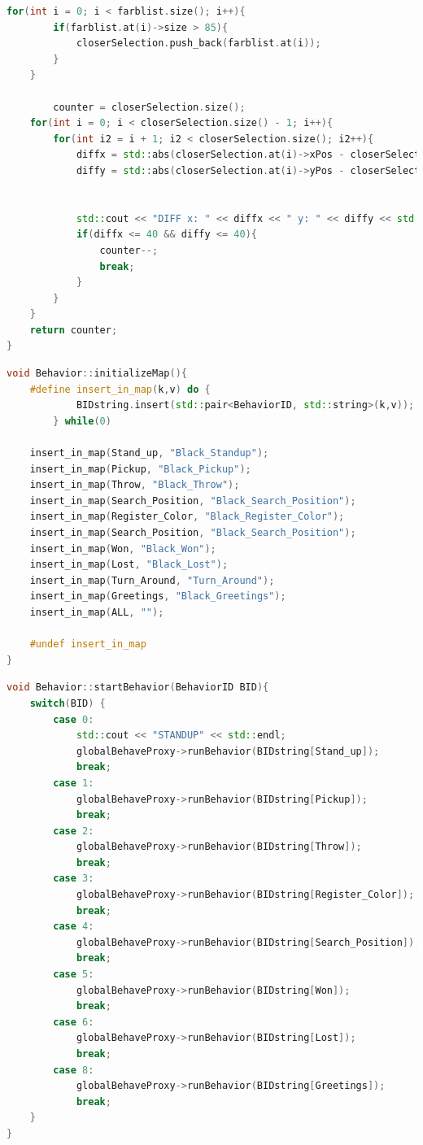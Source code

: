 \begin{appendix}
\begin{lstlisting}[language=c++,
                   caption={Funktion: "`getDiceValue''},
                   label={lst:getDiveValue1}]
    for(int i = 0; i < farblist.size(); i++){
        if(farblist.at(i)->size > 85){
            closerSelection.push_back(farblist.at(i));
        }
    }

        counter = closerSelection.size();
    for(int i = 0; i < closerSelection.size() - 1; i++){
        for(int i2 = i + 1; i2 < closerSelection.size(); i2++){
            diffx = std::abs(closerSelection.at(i)->xPos - closerSelection.at(i2)->xPos);
            diffy = std::abs(closerSelection.at(i)->yPos - closerSelection.at(i2)->yPos);


            std::cout << "DIFF x: " << diffx << " y: " << diffy << std::endl;
            if(diffx <= 40 && diffy <= 40){
                counter--;
                break;
            }
        }
    }
    return counter;
}
\end{lstlisting}

\begin{lstlisting}[language=c++,
                   caption={Behavior Map},
                   label={lst:behmap}]
void Behavior::initializeMap(){
    #define insert_in_map(k,v) do {                                     \
            BIDstring.insert(std::pair<BehaviorID, std::string>(k,v));  \
        } while(0)

    insert_in_map(Stand_up, "Black_Standup");
    insert_in_map(Pickup, "Black_Pickup");
    insert_in_map(Throw, "Black_Throw");
    insert_in_map(Search_Position, "Black_Search_Position");
    insert_in_map(Register_Color, "Black_Register_Color");
    insert_in_map(Search_Position, "Black_Search_Position");
    insert_in_map(Won, "Black_Won");
    insert_in_map(Lost, "Black_Lost");
    insert_in_map(Turn_Around, "Turn_Around");
    insert_in_map(Greetings, "Black_Greetings");
    insert_in_map(ALL, "");

    #undef insert_in_map
}
\end{lstlisting}

\begin{lstlisting}[language=c++,
                   caption={Behavior Enumerator},
                   label={lst:behstart}]
void Behavior::startBehavior(BehaviorID BID){
    switch(BID) {
        case 0:
            std::cout << "STANDUP" << std::endl;
            globalBehaveProxy->runBehavior(BIDstring[Stand_up]);
            break;
        case 1:
            globalBehaveProxy->runBehavior(BIDstring[Pickup]);
            break;
        case 2:
            globalBehaveProxy->runBehavior(BIDstring[Throw]);
            break;
        case 3:
            globalBehaveProxy->runBehavior(BIDstring[Register_Color]);
            break;
        case 4:
            globalBehaveProxy->runBehavior(BIDstring[Search_Position]);
            break;
        case 5:
            globalBehaveProxy->runBehavior(BIDstring[Won]);
            break;
        case 6:
            globalBehaveProxy->runBehavior(BIDstring[Lost]);
            break;
        case 8:
            globalBehaveProxy->runBehavior(BIDstring[Greetings]);
            break;
    }
}
\end{lstlisting}


\end{appendix}
